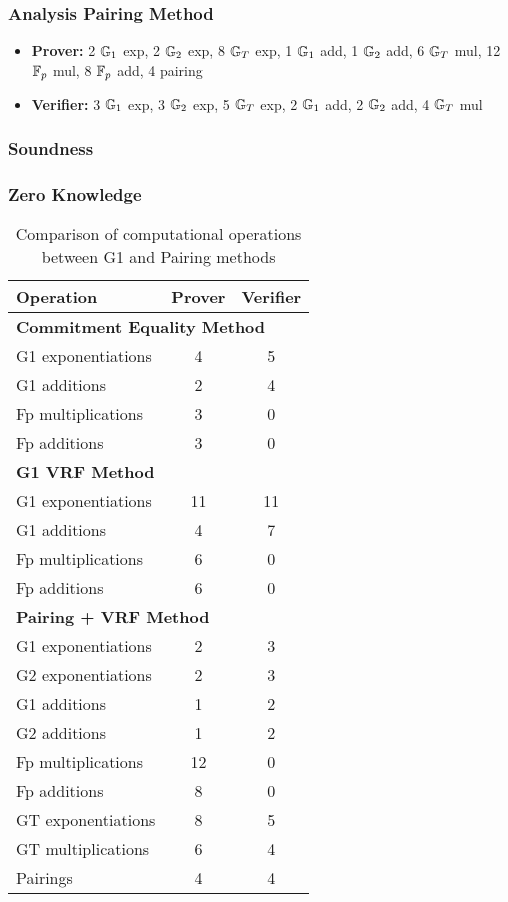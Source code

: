 \subsubsection{Analysis Pairing Method}
\begin{itemize}
    \item \textbf{Prover:} 2 $\mathbb{G}_1$ exp, 2 $\mathbb{G}_2$ exp, 8 $\mathbb{G}_T$ exp, 1 $\mathbb{G}_1$ add, 1 $\mathbb{G}_2$ add, 6 $\mathbb{G}_T$ mul, 12 $\mathbb{F}_p$ mul, 8 $\mathbb{F}_p$ add, 4 pairing
    
    \item \textbf{Verifier:} 3 $\mathbb{G}_1$ exp, 3 $\mathbb{G}_2$ exp, 5 $\mathbb{G}_T$ exp, 2 $\mathbb{G}_1$ add, 2 $\mathbb{G}_2$ add, 4 $\mathbb{G}_T$ mul
\end{itemize}

\subsubsection{Soundness}

\subsubsection{Zero Knowledge}



\begin{table}[h]
\centering
\begin{tabular}{|l|c|c|}
\hline
\textbf{Operation} & \textbf{Prover} & \textbf{Verifier} \\
\hline
\multicolumn{3}{|l|}{\textbf{Commitment Equality Method}} \\
\hline
G1 exponentiations & 4 & 5 \\
G1 additions & 2 & 4 \\
Fp multiplications & 3 & 0 \\
Fp additions & 3 & 0 \\
\hline
\multicolumn{3}{|l|}{\textbf{G1 VRF Method}} \\
\hline
G1 exponentiations & 11 & 11 \\
G1 additions & 4 & 7 \\
Fp multiplications & 6 & 0 \\
Fp additions & 6 & 0 \\
\hline
\multicolumn{3}{|l|}{\textbf{Pairing + VRF Method}} \\
\hline
G1 exponentiations & 2 & 3 \\
G2 exponentiations & 2 & 3 \\
G1 additions & 1 & 2 \\
G2 additions & 1 & 2 \\
Fp multiplications & 12 & 0 \\
Fp additions & 8 & 0 \\
GT exponentiations & 8 & 5 \\
GT multiplications & 6 & 4 \\
Pairings & 4 & 4 \\
\hline
\end{tabular}
\caption{Comparison of computational operations between G1 and Pairing methods}
\end{table}

